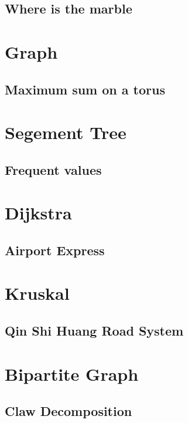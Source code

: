         \subsection{Where is the marble}
                

\section{Graph}
        \subsection{Maximum sum on a torus}
                

\section{Segement Tree}
        \subsection{Frequent values}
                

\section{Dijkstra}
        \subsection{Airport Express}
                

\section{Kruskal}
        \subsection{Qin Shi Huang Road System}
                

\section{Bipartite Graph}
        \subsection{Claw Decomposition}
                
